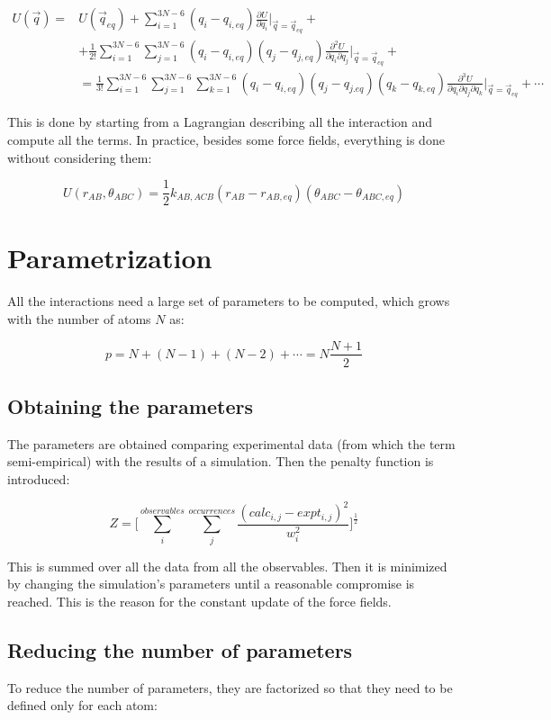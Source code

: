\begin{align*}
	U(\vec{q}) = &U(\vec{q}_{eq}) + \sum\limits_{i=1}^{3N-6}(q_i-q_{i,eq})\frac{\partial U}{\partial q_i}\biggr\vert_{\vec{q}=\vec{q}_{eq}} + \\
							 &+\frac{1}{2!}\sum\limits_{i=1}^{3N-6}\sum\limits_{j=1}^{3N-6}(q_i-q_{i,eq})(q_j-q_{j,eq})\frac{\partial^2 U}{\partial q_i\partial q_j}\biggr\vert_{\vec{q}=\vec{q}_{eq}} +\\
							 &=\frac{1}{3!}\sum\limits_{i=1}^{3N-6}\sum\limits_{j=1}^{3N-6}\sum\limits_{k=1}^{3N-6}(q_i-q_{i,eq})(q_j-q_{j.eq})(q_k-q_{k,eq})\frac{\partial^3 U}{\partial q_i\partial q_j\partial q_k}\biggr\vert_{\vec{q}=\vec{q}_{eq}} + \cdots
\end{align*}

This is done by starting from a Lagrangian describing all the interaction and compute all the terms.
In practice, besides some force fields, everything is done without considering them:

$$U(r_{AB}, \theta_{ABC}) = \frac{1}{2}k_{AB,ACB}(r_{AB}-r_{AB, eq})(\theta_{ABC}-\theta_{ABC, eq})$$

\section{Parametrization}
All the interactions need a large set of parameters to be computed, which grows with the number of atoms $N$ as:

$$p = N + (N-1)+(N-2)+\cdots = N\frac{N+1}{2}$$


	\subsection{Obtaining the parameters}
	The parameters are obtained comparing experimental data (from which the term semi-empirical) with the results of a simulation.
	Then the penalty function is introduced:

	$$Z = \biggl[\sum\limits_{i}^{observables}\sum\limits_{j}^{occurrences}\frac{(calc_{i,j}-expt_{i,j})^2}{w_i^2}\biggr]^{\frac{1}{2}}$$

	This is summed over all the data from all the observables.
	Then it is minimized by changing the simulation's parameters until a reasonable compromise is reached.
	This is the reason for the constant update of the force fields.

	\subsection{Reducing the number of parameters}
	To reduce the number of parameters, they are factorized so that they need to be defined only for each atom:

